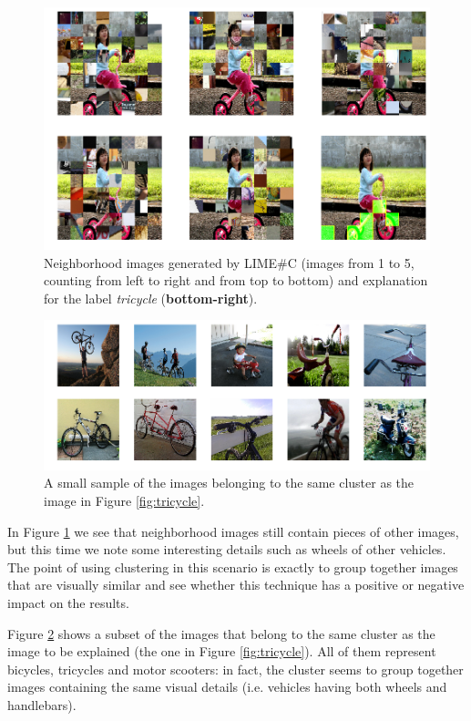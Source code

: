 \documentclass[12pt, twoside, a4paper]{report}
\begin{document}
\begin{figure}
\begin{center}
\includegraphics[width=.85\textwidth]{images/limesharpC_neighborhood.png} 
\caption{Neighborhood images generated by LIME\#C (images from 1 to 5, counting from left to right and from top to bottom) and explanation for the label \textit{tricycle} (\textbf{bottom-right}).}
\label{fig:limesharpC_neigh}
\end{center}
\end{figure}

\begin{figure}
\includegraphics[width=\textwidth]{images/limesharpC_same_clus.png} 
\caption{A small sample of the images belonging to the same cluster as the image in Figure \ref{fig:tricycle}.}
\label{fig:limesharpC_same_clus}
\end{figure}

In Figure \ref{fig:limesharpC_neigh} we see that neighborhood images still contain pieces of other images, but this time we note some interesting details such as wheels of other vehicles. The point of using clustering in this scenario is exactly to group together images that are visually similar and see whether this technique has a positive or negative impact on the results.

Figure \ref{fig:limesharpC_same_clus} shows a subset of the images that belong to the same cluster as the image to be explained (the one in Figure \ref{fig:tricycle}). All of them represent bicycles, tricycles and motor scooters: in fact, the cluster seems to group together images containing the same visual details (i.e. vehicles having both wheels and handlebars).
\end{document}
